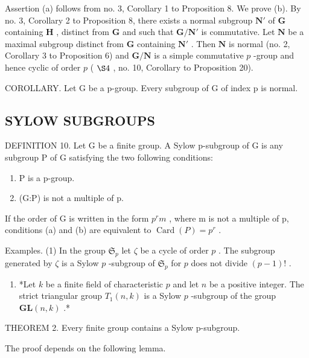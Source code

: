 Assertion (a) follows from no. 3, Corollary 1 to Proposition 8. We prove (b). By no. 3, Corollary 2 to Proposition 8, there exists a normal subgroup \(\mathbf{N}'\) of \(\mathbf{G}\) containing \(\mathbf{H}\) , distinct from \(\mathbf{G}\) and such that \(\mathbf{G} / \mathbf{N}'\) is commutative. Let \(\mathbf{N}\) be a maximal subgroup distinct from \(\mathbf{G}\) containing \(\mathbf{N}'\) . Then \(\mathbf{N}\) is normal (no. 2, Corollary 3 to Proposition 6) and \(\mathbf{G} / \mathbf{N}\) is a simple commutative \(p\) -group and hence cyclic of order \(p\) ( \(\S 4\) , no. 10, Corollary to Proposition 20).

COROLLARY. Let G be a p-group. Every subgroup of G of index p is normal.

\subsection{SYLOW SUBGROUPS}

DEFINITION 10. Let G be a finite group. A Sylow p-subgroup of G is any subgroup P of G satisfying the two following conditions:

\begin{enumerate}
\def\labelenumi{(\alph{enumi})}
\item
  P is a p-group.
\item
  (G:P) is not a multiple of p.
\end{enumerate}

If the order of G is written in the form \(p^{r}m\) , where m is not a multiple of p, conditions (a) and (b) are equivalent to \(\operatorname{Card}(P) = p^{r}\) .

Examples. (1) In the group \(\mathfrak{S}_p\) let \(\zeta\) be a cycle of order \(p\) . The subgroup generated by \(\zeta\) is a Sylow \(p\) -subgroup of \(\mathfrak{S}_p\) for \(p\) does not divide \((p - 1)!\) .

\begin{enumerate}
\def\labelenumi{(\arabic{enumi})}
\setcounter{enumi}{1}
\tightlist
\item
  *Let \(k\) be a finite field of characteristic \(p\) and let \(n\) be a positive integer. The strict triangular group \(T_1(n, k)\) is a Sylow \(p\) -subgroup of the group \(\mathbf{GL}(n, k)\) .*
\end{enumerate}

THEOREM 2. Every finite group contains a Sylow p-subgroup.

The proof depends on the following lemma.

